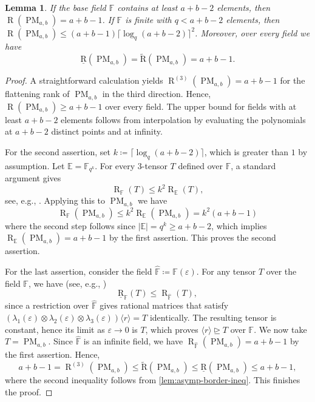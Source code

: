 \documentclass[11pt,letterpaper]{article}
\newtheorem{lemma}[theorem]{Lemma}\AddToHook{env/lemma/begin}{\crefalias{theorem}{lemma}}
\numberwithin{equation}{section}
\newcommand{\brk}{\underline{\mathrm{R}}}
\newcommand{\ark}{\widetilde{\mathrm{R}}}
\newcommand{\FF}{\mathbb{F}}
\DeclareMathOperator{\Rk}{\mathrm{R}}
\DeclareMathOperator{\PM}{PM}
\begin{document}
\begin{lemma}\label{lem:poly-mult-from-sum}
  If the base field $\mathbb{F}$ contains at least $a + b - 2$ elements, then $\Rk(\PM_{a, b}) = a + b - 1$.
  If $\FF$ is finite with $q<a+b-2$ elements, then $\Rk(\PM_{a,b})\leq (a+b-1)\lceil \log_q(a+b-2)\rceil^2$.
  Moreover, over every field we have \[
  \brk(\PM_{a,b}) = \ark(\PM_{a,b})=a+b-1.
  \]
\end{lemma}
\begin{proof}
A straightforward calculation yields $\Rk^{(3)}(\PM_{a,b})=a+b-1$ for the flattening rank of $\PM_{a,b}$ in the third direction.
Hence, $\Rk(\PM_{a,b})\geq a+b-1$ over every field.
The upper bound for fields with at least $a+b-2$ elements follows from interpolation by evaluating the polynomials at $a+b-2$ distinct points and at infinity.

   For the second assertion, set $k\coloneqq \lceil \log_q(a+b-2)\rceil$, which is greater than $1$ by assumption.
   Let $\mathbb{E}=\mathbb{F}_{q^k}$.
For every $3$-tensor $T$ defined over $\mathbb{F}$, a standard argument gives \begin{equation}
\label{eq:extensionscalars}
\Rk_{\mathbb{F}}(T)\leq k^2 \Rk_{\mathbb{E}}(T) ,
\end{equation} see, e.g., \cite[Lemma~6.10]{AFT-11}.
Applying this to $\PM_{a,b}$ we have \[
\Rk_{\mathbb{F}}(\PM_{a,b}) \leq k^2 \Rk_{\mathbb{E}}(\PM_{a,b}) = k^2 (a+b-1)
\] where the second step follows since $|\mathbb{E}|=q^k\geq a+b-2$, which implies $\Rk_{\mathbb{E}}(\PM_{a,b})=a+b-1$ by the first assertion.
This proves the second assertion.

For the last assertion, consider the field $\hat{\FF}\coloneqq \FF(\varepsilon)$.
For any tensor $T$ over the field $\FF$, we have (see, e.g., \cite[Example~2.4]{schonhage}) \[
\brk_{\FF}(T)\leq \Rk_{\hat{\FF}}(T),
\] since a restriction over $\hat{\FF}$ gives rational matrices that satisfy $(\lambda_1(\varepsilon)\otimes\lambda_2(\varepsilon)\otimes\lambda_3(\varepsilon))\langle r\rangle = T$ identically.
The resulting tensor is constant, hence its limit as $\varepsilon\rightarrow 0$ is $T$, which proves $\langle r\rangle\trianglerighteq T$ over $\FF$.
We now take $T=\PM_{a,b}$.
Since $\hat{\FF}$ is an infinite field, we have $\Rk_{\hat{\FF}}(\PM_{a,b})=a+b-1$ by the first assertion.
Hence, \[
a+b-1 = \Rk^{(3)}(\PM_{a,b})\leq\ark(\PM_{a,b})\leq \brk(\PM_{a,b})\leq a+b-1,
\] where the second inequality follows from \cref{lem:asymp-border-ineq}.
This finishes the proof.
\end{proof}
\end{document}
